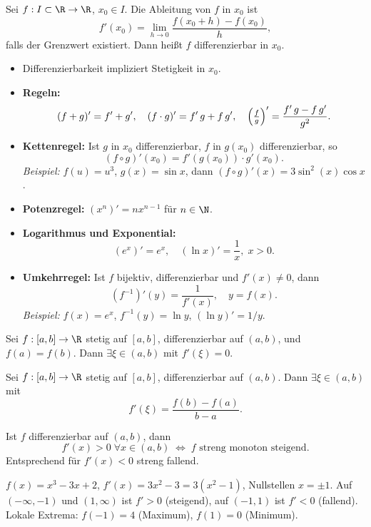 \begin{definition}[Ableitung]
  Sei $f:I\subset\R\to\R$, $x_0\in I$. Die Ableitung von $f$ in $x_0$ ist
  \[
    f'(x_0) = \lim_{h\to0} \frac{f(x_0 + h) - f(x_0)}{h},
  \]
  falls der Grenzwert existiert. Dann heißt $f$ differenzierbar in $x_0$.
\end{definition}
\begin{itemize}
  \item Differenzierbarkeit impliziert Stetigkeit in $x_0$.
  \item \textbf{Regeln:}
    \[
      (f+g)' = f' + g', \quad 
      (f\cdot g)' = f'\,g + f\,g', \quad
      \Bigl(\tfrac{f}{g}\Bigr)' = \frac{f'\,g - f\,g'}{g^2}.
    \]
  \item \textbf{Kettenregel:} Ist $g$ in $x_0$ differenzierbar, $f$ in $g(x_0)$ differenzierbar, so
    \[
      (f\circ g)'(x_0) = f'(g(x_0)) \cdot g'(x_0).
    \]
    \emph{Beispiel:} $f(u)=u^3$, $g(x)=\sin x$, dann $(f\circ g)'(x)=3\sin^2(x)\cos x$.
  \item \textbf{Potenzregel:} $(x^n)' = n x^{n-1}$ für $n\in\N$.
  \item \textbf{Logarithmus und Exponential:}  
    \[
      (e^x)' = e^x,\quad (\ln x)' = \frac{1}{x},\; x>0.
    \]
  \item \textbf{Umkehrregel:} Ist $f$ bijektiv, differenzierbar und $f'(x)\ne0$, dann
    \[
      (f^{-1})'(y) = \frac{1}{f'(x)},\quad y = f(x).
    \]
    \emph{Beispiel:} $f(x)=e^x$, $f^{-1}(y)=\ln y$, $(\ln y)' = 1/y$.
\end{itemize}

\begin{theorem}[Rolle]
  Sei $f:[a,b]\to\R$ stetig auf $[a,b]$, differenzierbar auf $(a,b)$, und $f(a)=f(b)$. Dann $\exists \xi\in(a,b)$ mit $f'(\xi)=0$.
\end{theorem}
\begin{theorem}
  Sei $f:[a,b]\to\R$ stetig auf $[a,b]$, differenzierbar auf $(a,b)$. Dann $\exists\xi\in(a,b)$ mit
  \[
    f'(\xi) = \frac{f(b)-f(a)}{b-a}.
  \]
\end{theorem}
\begin{corollary}[Monotoniekriterium]
  Ist $f$ differenzierbar auf $(a,b)$, dann
  \[
    f'(x) > 0\;\forall x\in(a,b)\;\Longleftrightarrow\;f\text{ streng monoton steigend}.
  \]
  Entsprechend für $f'(x)<0$ streng fallend.
\end{corollary}
\begin{example}
  $f(x)=x^3 - 3x + 2$, $f'(x)=3x^2 - 3 = 3(x^2 - 1)$, Nullstellen $x=\pm1$.  
  Auf $(-\infty,-1)$ und $(1,\infty)$ ist $f'>0$ (steigend), auf $(-1,1)$ ist $f'<0$ (fallend).  
  Lokale Extrema: $f(-1)=4$ (Maximum), $f(1)=0$ (Minimum).
\end{example}

